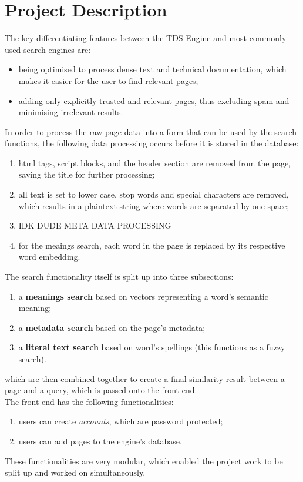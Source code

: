 \section{Project Description}

The key differentiating features between the TDS Engine and most commonly used search engines are:

\begin{itemize}
  \item being optimised to process dense text and technical documentation, which makes it easier for the user to find relevant pages;
  \item adding only explicitly trusted and relevant pages, thus excluding spam and minimising irrelevant results.
\end{itemize}

In order to process the raw page data into a form that can be used by the search functions, the following data processing occurs before it is stored in the database:
\begin{enumerate}
  \item html tags, script blocks, and the header section are removed from the page, saving the title for further processing;
  \item all text is set to lower case, stop words and special characters are removed, which results in a plaintext string where words are separated by one space;
  \item IDK DUDE META DATA PROCESSING
  \item for the meaings search, each word in the page is replaced by its respective word embedding. 
\end{enumerate}

The search functionality itself is split up into three subsections:
\begin{enumerate}
  \item a \textbf{meanings search} based on vectors representing a word's semantic meaning;
  \item a \textbf{metadata search} based on the page's metadata;
  \item a \textbf{literal text search} based on word's spellings (this functions as a fuzzy search).
\end{enumerate}
which are then combined together to create a final similarity result between a page and a query, which is passed onto the front end. \\

The front end has the following functionalities:
\begin{enumerate}
  \item users can create \textit{accounts}, which are password protected;
  \item users can add pages to the engine's database.
\end{enumerate}

These functionalities are very modular, which enabled the project work to be split up and worked on simultaneously.  
